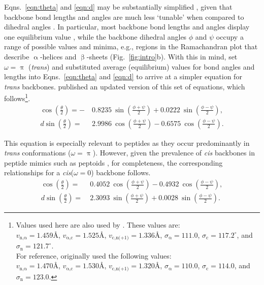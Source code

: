 \documentclass[fleqn,10pt,lineno]{wlpeerj} %
\newcommand{\n}[1]{{\color{black}#1}} %
\newcommand{\Fig}[1]{Fig.~\ref{#1}}
\newcommand{\Eqns}[1]{Eqns.~\ref{#1}}
\newcommand{\cis}{{\em cis}\xspace}
\newcommand{\trans}{{\em trans}\xspace}
\begin{document}
\n{\Eqns{eqn:theta} and \ref{eqn:d} may be substantially simplified \citep{Miyazawa1961}, given that backbone bond lengths and angles are much less `tunable' when compared to dihedral angles \citep{Ramachandran1963,Improta2015,Esposito2013,Improta2015a}. In particular, most backbone bond lengths and angles display one equilibrium value \citep{Improta2015,Esposito2013,Improta2015a}, while the backbone dihedral angles $\phi$ and $\psi$ occupy a range of possible values and minima, e.g., regions in the Ramachandran plot that describe $\upalpha$-helices and $\upbeta$-sheets (\Fig{fig:intro}b). With this in mind, \cite{Miyazawa1961} set $\omega=\uppi$ (\trans) and substituted average (equilibrium) values for bond angles and lengths into \Eqns{eqn:theta} and \ref{eqn:d} to arrive at a simpler equation for \trans backbones. \cite{Zacharias2013} published an updated version of this set of equations, which} follows\footnote{Values used here are also used by \cite{Zacharias2013}. These values are: \\ %
$v_{\textrm{n,}\upalpha} = 1.459\textrm{\AA}$,\hfill
$v_{\upalpha\textrm{,c}} = 1.525\textrm{\AA}$, \hfill
$v_\textrm{c,n(+1)} = 1.336\textrm{\AA}$, \hfill
$\sigma_\upalpha = 111.0$,\hfill
$\sigma_\textrm{c} = 117.2^\circ$, \hfill and \hfill
$\sigma_\textrm{n} = 121.7^\circ$. \hfill \\
For reference, \cite{Miyazawa1961} originally used the following values:\\ 
$v_{\textrm{n,}\upalpha} = 1.470\textrm{\AA}$,\hfill
$v_{\upalpha\textrm{,c}} = 1.530\textrm{\AA}$,\hfill 
$v_\textrm{c,n(+1)} = 1.320\textrm{\AA}$, \hfill
$\sigma_\upalpha = 110.0$,\hfill
$\sigma_\textrm{c} = 114.0$, \hfill and \hfill
$\sigma_\textrm{n} = 123.0$.}.
\begin{align}
\label{eqn:theta_trans}
\cos\left(\frac{\theta}{2}\right) =-&~0.8235~\sin\left(\frac{\phi+\psi}{2}\right) 
                                    +0.0222~\sin\left(\frac{\phi-\psi}{2}\right),\\
\label{eqn:d_trans}
d \sin\left(\frac{\theta}{2}\right) =&~2.9986~\cos\left(\frac{\phi+\psi}{2}\right)
                                      -0.6575~\cos\left(\frac{\phi-\psi}{2}\right).
\end{align}

This equation is especially relevant to peptides as they occur predominantly in \trans conformations ($\omega=\uppi$). However, given the prevalence of \cis backbones in peptide mimics such as peptoids \citep{Mirijanian2014,Gorske2016}, for completeness, \n{the corresponding relationships for a \cis ($\omega=0$) backbone follows.}
\begin{align}
\label{eqn:theta_cis}
\cos\left(\frac{\theta}{2}\right) =&~0.4052~\cos\left(\frac{\phi+\psi}{2}\right)
                                    -0.4932~\cos\left(\frac{\phi-\psi}{2}\right), \\
\label{eqn:d_cis}
d \sin\left(\frac{\theta}{2}\right) = &~2.3093~\sin\left(\frac{\phi+\psi}{2}\right)
                                       +0.0028~\sin\left(\frac{\phi-\psi}{2}\right).
\end{align}
\end{document}
